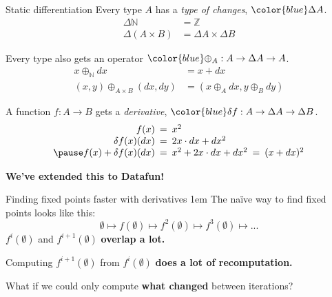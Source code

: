 \documentclass[xcolor=table,usenames,dvipsnames,svgnames]{beamer}
\newcommand{\N}{\mathbb{N}}
\newcommand{\x}{\times}
\newcommand{\GD}{\Delta}
\begin{document}

\begin{frame}{Static differentiation}
  \vspace{-1em}
  Every type $A$ has a \emph{type of changes}, $\color{blue}\Delta A$.
  \pause
  \begin{align*}
    \GD \mathbb{N} &= \mathbb{Z}\\
    \GD (A \x B) &= \GD A \x \GD B
  \end{align*}

  \pause Every type also gets an operator $\color{blue}\oplus_A : A \to \GD A \to A$.
  \pause
  \begin{align*}
    x \oplus_\N dx &= x + dx\\
    (x,y) \oplus_{A \x B} (dx,dy) &= (x \oplus_A dx, y \oplus_B dy)
  \end{align*}

  \pause A function $f : A \to B$ gets a \emph{derivative},
  $\color{blue} \delta f : A \to \Delta A \to \Delta B$.
  \pause
  \[\setlength{\arraycolsep}{.25em}\begin{array}{rclcl}
    f(x) &=& x^2\\
    \delta f(x)(dx) &=& 2x\cdot dx+dx^2\\
    \pause
    f(x) + \delta f(x)(dx) &=& x^2 + 2x\cdot dx + dx^2 &=& (x + dx)^2
  \end{array}\]



\end{frame}


\begin{frame}\centering\LARGE
  \textbf{We've extended this to Datafun!}

\end{frame}


\begin{frame}{Finding fixed points faster with derivatives}
  \large \parskip 1em
  The na\"ive way to find fixed points looks like this:
  $${\emptyset \mapsto f(\emptyset) \mapsto f^2(\emptyset) \mapsto f^3(\emptyset) \mapsto ...}$$
  \pause
  $f^i(\emptyset)$ and $f^{i+1}(\emptyset)$ \textbf{overlap a lot.}

  Computing $f^{i+1}(\emptyset)$ from $f^i(\emptyset)$ \textbf{does a lot of recomputation.}

  \pause
  What if we could only compute \textbf{what changed} between iterations?
\end{frame}
\end{document}
